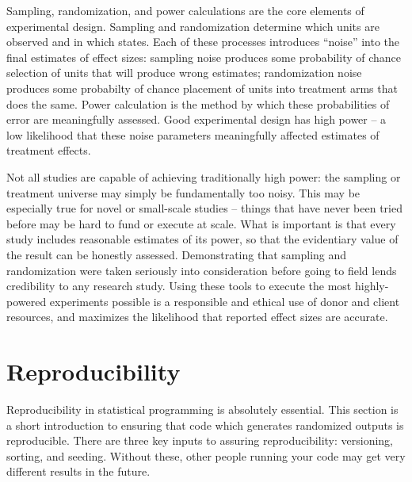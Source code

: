 
\begin{fullwidth}
Sampling, randomization, and power calculations are the core elements of experimental design.
Sampling and randomization determine which units are observed and in which states.
Each of these processes introduces ``noise'' into the final estimates of effect sizes:
sampling noise produces some probability of chance selection of units that will produce wrong estimates;
randomization noise produces some probabilty of chance placement of units into treatment arms that does the same.
Power calculation is the method by which these probabilities of error are meaningfully assessed.
Good experimental design has high power -- a low likelihood that these noise parameters meaningfully affected estimates of treatment effects.

Not all studies are capable of achieving traditionally high power:
the sampling or treatment universe may simply be fundamentally too noisy.
This may be especially true for novel or small-scale studies --
things that have never been tried before may be hard to fund or execute at scale.
What is important is that every study includes reasonable estimates of its power,
so that the evidentiary value of the result can be honestly assessed.
Demonstrating that sampling and randomization were taken seriously into consideration
before going to field lends credibility to any research study.
Using these tools to execute the most highly-powered experiments possible
is a responsible and ethical use of donor and client resources,
and maximizes the likelihood that reported effect sizes are accurate.
\end{fullwidth}

\section{Reproducibility}

Reproducibility in statistical programming is absolutely essential.
This section is a short introduction to ensuring that code
which generates randomized outputs is reproducible.
There are three key inputs to assuring reproducibility:
versioning, sorting, and seeding.
Without these, other people running your code may get very different results in the future.

